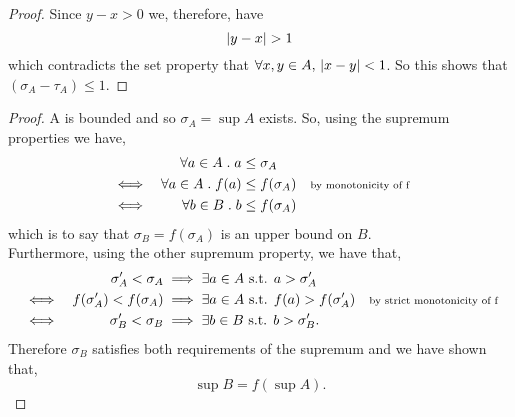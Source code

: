 \documentclass[../MathsNotesBase.tex]{subfiles}
\begin{document}
{\begin{proof}
			Since ${ y - x > 0 }$ we, therefore, have
			\[ \left\lvert y - x\right\rvert > 1 \]
			which contradicts the set property that $ \forall x,y \in A, \, \left\lvert x - y\right\rvert < 1 $. So this shows that $ (\sigma_A - \tau_A) \leq 1 $.
		\end{proof}
		
		
		\bigskip
		\begin{proof}
			A is bounded and so ${ \sigma_A = \sup A }$ exists. So, using the supremum properties we have,
			\begin{align*}
				&& \forall a \in A \;.\; a &\leq \sigma_A  \\
				&\iff & \forall a \in A \;.\; f(a)  &\leq f(\sigma_A)  &\text{\scriptsize{by monotonicity of f}}\\
				&\iff & \forall b \in B \;.\; b  &\leq f(\sigma_A) 
			\end{align*}
			which is to say that $\sigma_B = f(\sigma_A)$ is an upper bound on $B$.\\
			Furthermore, using the other supremum property, we have that,
			\begin{align*}
				&& \sigma_A' < \sigma_A &\implies \exists a \in A \text{ s.t. } a > \sigma_A' \\
				&\iff & f(\sigma_A') < f(\sigma_A)  &\implies \exists a \in A \text{ s.t. } f(a) > f(\sigma_A')  &\text{\scriptsize{by strict monotonicity of f}}\\
				&\iff & \sigma_B' < \sigma_B  &\implies \exists b \in B \text{ s.t. } b > \sigma_B'.	
			\end{align*}
			Therefore $\sigma_B$ satisfies both requirements of the supremum and we have shown that,
			\[ \sup B = f(\sup A). \]
		\end{proof}
	}



	
\pagebreak
\end{document}
